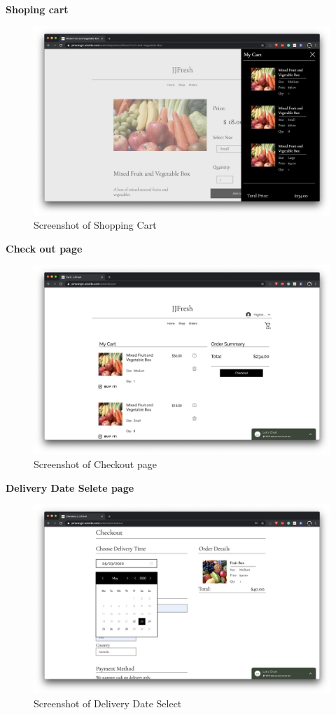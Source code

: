 \documentclass{report}
\begin{document}
\clearpage
\textbf{Shoping cart}
\begin{figure}[htp]
\centering
\includegraphics[width=\textwidth]{Figures/shoppingCart.png}
\caption{Screenshot of Shopping Cart}
\label{fig:shoppingCart}
\end{figure}

\clearpage
\textbf{Check out page}
\begin{figure}[htp]
\centering
\includegraphics[width=\textwidth]{Figures/checkoutPage.png}
\caption{Screenshot of Checkout page}
\label{fig:checkoutPage}
\end{figure}

\clearpage
\textbf{Delivery Date Selete page}
\begin{figure}[htp]
\centering
\includegraphics[width=\textwidth]{Figures/dateSelect.png}
\caption{Screenshot of Delivery Date Select}
\label{fig:dateSelect}
\end{figure}
\end{document}
